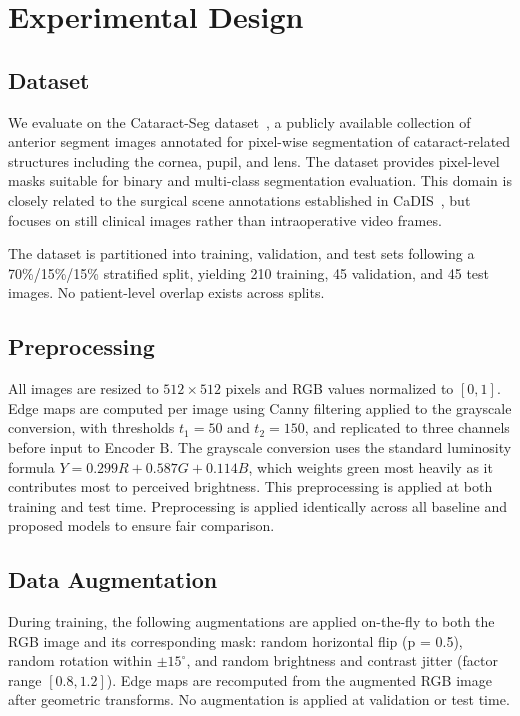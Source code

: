 \section{Experimental Design}

\subsection{Dataset}

We evaluate on the Cataract-Seg dataset~\cite{cataractseg2023roboflow}, a publicly available collection of anterior segment images annotated for pixel-wise segmentation of cataract-related structures including the cornea, pupil, and lens. The dataset provides pixel-level masks suitable for binary and multi-class segmentation evaluation. This domain is closely related to the surgical scene annotations established in CaDIS~\cite{grammatikopoulou2021cadis}, but focuses on still clinical images rather than intraoperative video frames.

The dataset is partitioned into training, validation, and test sets following a 70\%/15\%/15\% stratified split, yielding 210 training, 45 validation, and 45 test images. No patient-level overlap exists across splits.

\subsection{Preprocessing}

All images are resized to $512 \times 512$ pixels and RGB values normalized to $[0, 1]$. Edge maps are computed per image using Canny filtering applied to the grayscale conversion, with thresholds $t_1 = 50$ and $t_2 = 150$, and replicated to three channels before input to Encoder B. The grayscale conversion uses the standard luminosity formula $Y = 0.299R + 0.587G + 0.114B$, which weights green most heavily as it contributes most to perceived brightness. This preprocessing is applied at both training and test time. Preprocessing is applied identically across all baseline and proposed models to ensure fair comparison.

\subsection{Data Augmentation}

During training, the following augmentations are applied on-the-fly to both the RGB image and its corresponding mask: random horizontal flip (p = 0.5), random rotation within $\pm 15^{\circ}$, and random brightness and contrast jitter (factor range $[0.8, 1.2]$). Edge maps are recomputed from the augmented RGB image after geometric transforms. No augmentation is applied at validation or test time.

